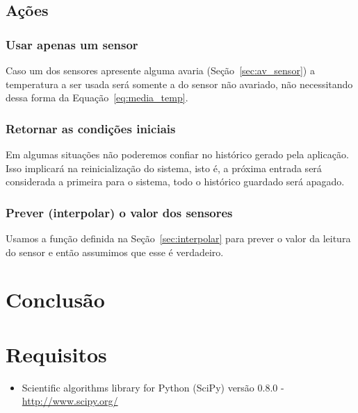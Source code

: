 \documentclass[a4paper,12pt]{article}
\begin{document}
\subsection{Ações}
\subsubsection{Usar apenas um sensor}\label{ac:falta_sensor}
Caso um dos sensores apresente alguma avaria (Seção~\ref{sec:av_sensor}) a
temperatura a ser usada será somente a do sensor não avariado, não necessitando
dessa forma da Equação~\ref{eq:media_temp}.

\subsubsection{Retornar as condições iniciais}\label{ac:condicoes_iniciais}
Em algumas situações não poderemos confiar no histórico gerado pela
aplicação. Isso implicará na reinicialização do sistema, isto é, a próxima
entrada será considerada a primeira para o sistema, todo o histórico
guardado será apagado.
	
\subsubsection{Prever (interpolar) o valor dos
	sensores}\label{ac:interpolar_sensores}
Usamos a função definida na Seção~\ref{sec:interpolar} para prever o valor da
leitura do sensor e então assumimos que esse é verdadeiro.

\section{Conclusão}

\section{Requisitos}

\begin{itemize}
	\item Scientific algorithms library for Python (SciPy) versão 0.8.0 -
		\url{http://www.scipy.org/}
\end{itemize}



\end{document}
